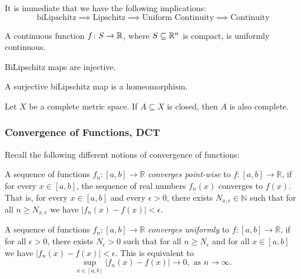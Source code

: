 \begin{remark}
It is immediate that we have the following implications:
\[
\text{biLipschitz} \implies \text{Lipschitz} \implies \text{Uniform Continuity} \implies \text{Continuity}
\]
\end{remark}

\begin{theorem}
A continuous function $f \colon S \rightarrow \mathbb{R}$, where $S \subseteq \mathbb{R}^n$ is compact, 
is uniformly continuous.
\end{theorem}

\begin{proposition}
BiLipschitz maps are injective.
\end{proposition}

\begin{proposition}
A surjective biLipschitz map is a homeomorphism.
\end{proposition}

\begin{theorem}
Let $X$ be a complete metric space. If $A \subseteq X$ is closed, then $A$ is also complete.
\end{theorem}

\subsubsection{Convergence of Functions, DCT}

Recall the following different notions of convergence of functions:

\begin{df}
A sequence of functions $f_n \colon [a, b] \rightarrow \mathbb{R}$ 
\emph{converges point-wise} to $f \colon [a,b] \rightarrow \mathbb{R}$,
if for every $x \in [a,b]$, the sequence of real numbers $f_n(x)$ converges to $f(x)$. 
That is, for every $x \in [a,b]$ and every $\epsilon > 0$, there exists $N_{x, \epsilon} \in \mathbb{N}$ 
such that for all $n \geq N_{x, \epsilon}$ we have $|f_n(x) - f(x)| < \epsilon$.
\end{df}

\begin{df}
A sequence of functions $f_n \colon [a, b] \rightarrow \mathbb{R}$ 
\emph{converges uniformly} to $f \colon [a, b] \rightarrow \mathbb{R}$, 
if for all $\epsilon > 0$, there exists $N_{\epsilon} > 0$ such that for all $n \geq N_{\epsilon}$ and for all $x \in [a, b]$ we have $|f_n(x) - f(x)| < \epsilon$. This is equivalent to
\[
\sup \limits_{x \in [a, b]} |f_n(x) - f(x)| \rightarrow 0, \text{ as } n \rightarrow \infty.
\]
\end{df}

